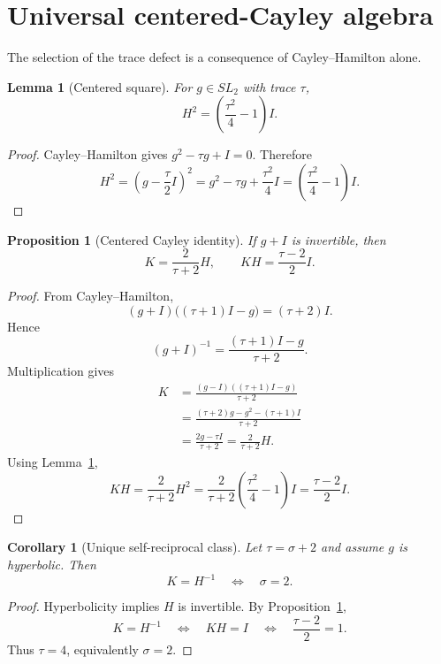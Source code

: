 \documentclass[11pt]{article}
\newtheorem{proposition}[theorem]{Proposition}
\newtheorem{corollary}[theorem]{Corollary}
\newtheorem{lemma}[theorem]{Lemma}
\theoremstyle{definition}
\theoremstyle{remark}
\begin{document}
\section{Universal centered-Cayley algebra}

The selection of the trace defect is a consequence of Cayley--Hamilton alone.

\begin{lemma}[Centered square]
\label{lem:centered-square}
For $g\in SL_2$ with trace $\tau$,
\[
\boxed{H^2=\left(\frac{\tau^2}{4}-1\right)I.}
\]
\end{lemma}

\begin{proof}
Cayley--Hamilton gives $g^2-\tau g+I=0$.  Therefore
\[
H^2
=\left(g-\frac\tau2I\right)^2
=g^2-\tau g+\frac{\tau^2}{4}I
=\left(\frac{\tau^2}{4}-1\right)I.
\]
\end{proof}

\begin{proposition}[Centered Cayley identity]
\label{prop:centered-cayley}
If $g+I$ is invertible, then
\[
\boxed{
K=\frac{2}{\tau+2}H,
\qquad
KH=\frac{\tau-2}{2}I.
}
\]
\end{proposition}

\begin{proof}
From Cayley--Hamilton,
\[
(g+I)\bigl((\tau+1)I-g\bigr)
=(\tau+2)I.
\]
Hence
\[
(g+I)^{-1}=\frac{(\tau+1)I-g}{\tau+2}.
\]
Multiplication gives
\begin{align*}
K
&=\frac{(g-I)((\tau+1)I-g)}{\tau+2}\\
&=\frac{(\tau+2)g-g^2-(\tau+1)I}{\tau+2}\\
&=\frac{2g-\tau I}{\tau+2}
=\frac{2}{\tau+2}H.
\end{align*}
Using Lemma~\ref{lem:centered-square},
\[
KH
=\frac{2}{\tau+2}H^2
=\frac{2}{\tau+2}\left(\frac{\tau^2}{4}-1\right)I
=\frac{\tau-2}{2}I.
\]
\end{proof}

\begin{corollary}[Unique self-reciprocal class]
\label{cor:self-reciprocal}
Let $\tau=\sigma+2$ and assume $g$ is hyperbolic.  Then
\[
\boxed{K=H^{-1}\quad\Longleftrightarrow\quad\sigma=2.}
\]
\end{corollary}

\begin{proof}
Hyperbolicity implies $H$ is invertible.  By
Proposition~\ref{prop:centered-cayley},
\[
K=H^{-1}
\quad\Longleftrightarrow\quad
KH=I
\quad\Longleftrightarrow\quad
\frac{\tau-2}{2}=1.
\]
Thus $\tau=4$, equivalently $\sigma=2$.
\end{proof}
\end{document}
